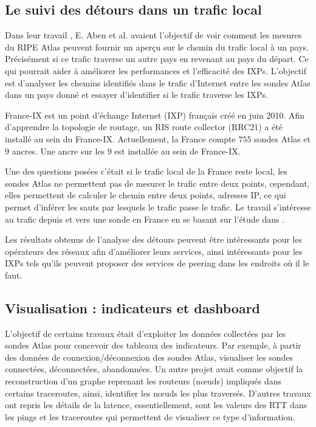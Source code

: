 \subsection{Le suivi des détours dans un trafic local}

Dans leur travail \cite{Emile-Aben-IXP-countries}, E. Aben et al. avaient l'objectif de  voir comment les mesures du RIPE Atlas peuvent fournir un aperçu sur le chemin du trafic local à un pays. Précisément si ce trafic traverse un autre pays en revenant au pays du départ.  Ce qui pourrait  aider à améliorer les performances et l'efficacité des IXPs.  L'objectif est  d'analyser les chemins identifiés dans le trafic d'Internet entre les sondes  Atlas dans un pays donné et essayer d'identifier si le trafic  traverse les IXPs.


France-IX est un point d'échange Internet (IXP) français créé en juin 2010. Afin d'apprendre la topologie de routage, un RIS route collector (RRC21) a été installé au sein du France-IX. Actuellement, la France compte $755$ sondes  Atlas et $9$ ancres. Une ancre sur les $9$ est installée au sein de France-IX.

Une des questions posées c'était si le trafic local de la France reste local, les sondes  Atlas ne permettent pas de mesurer le trafic entre deux points, cependant, elles permettent de calculer le chemin entre deux points, adresses IP, ce qui permet d'inférer les sauts par lesquels  le trafic passe le trafic. Le travail \cite{France-IX} s'intéresse au trafic depuis et vers une sonde en France en se basant sur l'étude dans \cite{Emile-Aben-IXP-countries}.


Les résultats obtenus de l'analyse des détours peuvent être intéressants pour les opérateurs des réseaux afin d'améliorer leurs services, ainsi intéressants pour les IXPs tels qu'ils peuvent  proposer des services de peering dans les endroits où il le faut.


\subsection{Visualisation : indicateurs et dashboard}

L'objectif de certains travaux était d'exploiter les données collectées par les sondes Atlas pour concevoir des tableaux des indicateurs. Par exemple, à partir des données de connexion/déconnexion des sondes Atlas, visualiser les sondes connectées, déconnectées, abandonnées. Un autre projet avait comme objectif la reconstruction d'un graphe reprenant les routeurs (n\oe{}uds) impliqués dans certains traceroutes, ainsi, identifier les n\oe{}uds les plus traversés. D'autres travaux ont repris les détails de la latence, essentiellement, sont les valeurs des RTT dans les pings et les traceroutes qui permettent de visualiser ce type d'information. 


